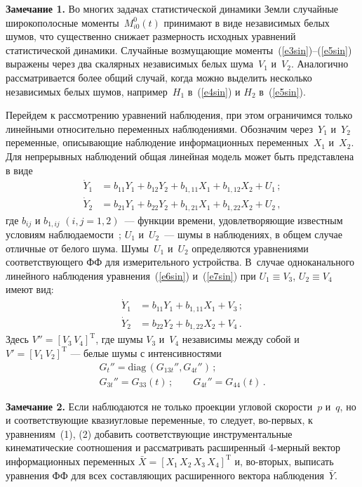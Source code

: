 \begin{multicols}{2}
\smallskip
\noindent
\textbf{Замечание 1.} Во многих задачах статистической динамики Земли случайные  
широкополосные моменты~$M_{i0}^0 (t)$ принимают в виде независимых белых шумов, 
что существенно снижает размерность исходных уравнений статистической динамики.
Случайные возмущающие моменты~(\ref{e3sin})--(\ref{e5sin}) выражены через два скалярных независимых 
белых шума~$V_1$ и~$V_2$. Аналогично рассматривается более общий случай, когда можно выделить 
несколько независимых белых шумов, например~$H_1$ в~(\ref{e4sin}) и  $H_2$ в~(\ref{e5sin}).

\smallskip

Перейдем к рассмотрению уравнений наблюдения, при этом ограничимся только линейными относительно 
переменных наблюдениями. Обозна\-чим через~$Y_1$ и~$Y_2$ переменные, опи\-сы\-ва\-ющие наблю\-де\-ние 
информационных переменных~$X_1$ и~$X_2$.
Для непрерывных наблюдений общая линейная модель может быть представлена в ви\-де~\cite{4sin}
\begin{align} 
\dot Y_1 &= b_{11} Y_1 + b_{12} Y_2 + b_{1,11} X_1 + b_{1, 12} X_2 + U_1\,;\label{e6sin}\\
\dot Y_2 &= b_{21} Y_1 + b_{22} Y_2 + b_{1,21} X_1 + b_{1, 22} X_2 + U_2\,,\label{e7sin}
\end{align}
где $b_{ij}$ и $b_{1, ij}$ $(i,j=1,2)$~--- функции времени, удовлетворяющие известным условиям наблю\-да\-емости~\cite{4sin}; 
$U_1$ и~$U_2$~--- шумы в наблюдениях, в общем случае отличные от белого шума. Шумы~$U_1$ и~$U_2$ 
определяются уравнениями соответствующего ФФ для измерительного устройства.  В~случае одноканального 
линейного наблюдения уравнения~(\ref{e6sin}) и~(\ref{e7sin}) при $U_1 \equiv V_3$, $U_2 \equiv V_4$ имеют вид:
\begin{align}
\dot Y_1 &= b_{11} Y_1 + b_{1,11} X_1 + V_3\,;\label{e8sin}\\
\dot Y_2 &= b_{22} Y_2 + b_{1,22} X_2 +V_4\,.\label{e9sin}
\end{align}
Здесь $V''=[V_3\, V_4]^{\mathrm{T}}$, где шумы $V_3$ и~$V_4$  независимы между собой 
и  $V'=[V_1\,V_2]^{\mathrm{T}}$ --- белые шумы с интенсивностями
   \begin{gather*}
     G_t'' =\mathrm {diag}\, (G_{13t}'', G_{4t}'')\,;\\
     G_{3t}'' = G_{33} (t)\,;\qquad G_{4t}'' = G_{44}(t)\,.
     \end{gather*}

\smallskip

\noindent
\textbf{Замечание 2.} Если наблюдаются не только проекции угловой скорости~$p$ и~$q$, но и соответствующие 
квазиугловые переменные, то следует, во-первых, к уравнениям~(1), (2) добавить соответствующие 
инструментальные кинематические соотношения и рассматривать расширенный 4-мерный вектор информационных 
переменных $\bar X =[X_1\,X_2\,X_3\, X_4]^{\mathrm{T}}$ и, во-вторых, выписать уравнения 
ФФ для всех со\-став\-ля\-ющих расширенного вектора наблюдения~$\bar Y$.


\end{multicols}
